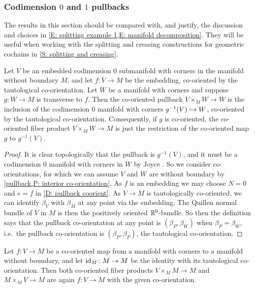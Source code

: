 \subsubsection{Codimension $0$ and $1$ pullbacks}\label{S: codim 0 and 1 co-or}

The results in this section should be compared with, and justify, the discussion and choices in \cref{E: splitting example 1,E: manifold decomposition}.
They will be useful when working with the splitting and creasing constructions for geometric cochains in \cref{S: splitting and creasing}.

\begin{proposition}\label{P: codim 0 pullback}
	Let $V$ be an embedded codimension $0$ submanifold with corners in the manifold without boundary $M$, and let $f \colon V \to M$ be the embedding, co-oriented by the tautological co-orientation.
	Let $W$ be a manifold with corners and suppose $g \colon W \to M$ is transverse to $f$.
	Then the co-oriented pullback $V \times_M W \to W$ is the inclusion of the codimension $0$ manifold with corners $g^{-1}(V) \hookrightarrow W$, co-oriented by the tautological co-orientation.
	Consequently, if $g$ is co-oriented, the co-oriented fiber product $V \times_M W \to M$ is just the restriction of the co-oriented map $g$ to $g^{-1}(V)$.
\end{proposition}

\begin{proof}
	It is clear topologically that the pullback is $g^{-1}(V)$, and it must be a codimension $0$ manifold with corners in $W$ by Joyce \cite[Theorem 6.4]{Joy12}.
	So we consider co-orientations, for which we can assume $V$ and $W$ are without boundary by \cref{pullback,P: interior co-orientation}.
	As $f$ is an embedding we may choose $N = 0$ and $e = f$ in \cref{D: pullback coorient}.
	As $V \to M$ is tautologically co-oriented, we can identify $\beta_V$ with $\beta_M$ at any point via the embedding.
	The Quillen normal bundle of $V$ in $M$ is then the positively oriented $\mathbb{R}^0$-bundle.
	So then the definition says that the pullback co-orientation at any point is $(\beta_P, \beta_W)$ when $\beta_P = \beta_W$, i.e.\ the pullback co-orientation is $(\beta_P, \beta_P)$, the tautological co-orientation.
\end{proof}

\begin{corollary}\label{C: cup with identity}
	Let $f \colon V \to M$ be a co-oriented map from a manifold with corners to a manifold without boundary, and let $\mathrm{id}_M \colon M \to M$ be the identity with its tautological co-orientation.
	Then both co-oriented fiber products $V \times_M M \to M$ and $M \times_M V \to M$ are again $f \colon V \to M$ with the given co-orientation.
\end{corollary}

